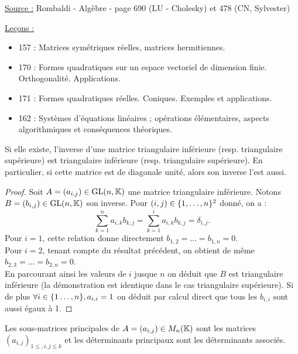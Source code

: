 
\newcommand{\Gln}{\text{GL}(n,\K)}
\newcommand{\trans}[1]{\prescript{t}{}{#1}}

\pagestyle{fancy}

\fancyhead[C]{}
\fancyhead[R]{}



\underline{Source :} Rombaldi - Algèbre - page 690 (LU - Cholesky) et 478 (CN, Sylvester)

\underline{Leçons :}
\begin{itemize}
\item  157 : Matrices symétriques réelles, matrices hermitiennes.
\item  170 : Formes quadratiques sur un espace vectoriel de dimension finie. Orthogonalité. Applications.
\item  171 : Formes quadratiques réelles. Coniques. Exemples et applications.
\item  162 : Systèmes d’équations linéaires ; opérations élémentaires, aspects algorithmiques et conséquences théoriques.
\end{itemize}

\begin{lem}
\label{lem:1}
Si elle existe, l'inverse d'une matrice triangulaire inférieure (resp. triangulaire supérieure) est triangulaire inférieure
(resp. triangulaire supérieure).
En particulier, si cette matrice est de diagonale unité, alors son inverse l'est aussi.
\end{lem}

\begin{proof}
Soit $A = (a_{i,j}) \in \Gln$ une matrice triangulaire inférieure. Notons $B = (b_{i,j}) \in \Gln$ son inverse.
Pour $(i,j) \in \{ 1, \dots, n \}^2$ donné, on a :
\[ \sum_{k=1}^n a_{i,k} b_{k,j} = \sum_{k=1}^i a_{i,k} b_{k,j} = \delta_{i,j} . \]
Pour $i=1$, cette relation donne directement $b_{1,2} = \dots = b_{1, n} = 0$. \\
Pour $i=2$, tenant compte du résultat précédent, on obtient de même $b_{2,3} = \dots = b_{2,n} = 0$. \\
En parcourant ainsi les valeurs de $i$ jusque $n$ on déduit que $B$ est triangulaire inférieure (la démonstration est identique
dans le cas triangulaire supérieure).
Si de plus $\forall i \in \{ 1 \dots, n \}, a_{i,i} = 1$ on déduit par calcul direct que tous les $b_{i,i}$ sont aussi égaux à 1.
\end{proof}

\begin{defn}
Les sous-matrices principales de $A=(a_{i,j}) \in M_{n}(\mathbb{K})$ sont les matrices $(a_{i,j})_{1 \leq, i,j \leq k}$
et les déterminants principaux sont les déterminants associés.
\end{defn}


